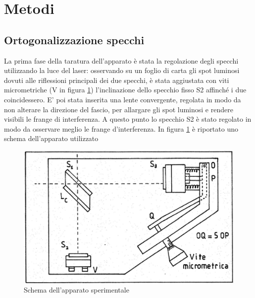 \documentclass{article}
\begin{document}
\section{Metodi}
\subsection{Ortogonalizzazione specchi}
    La prima fase della taratura dell'apparato è stata la regolazione degli specchi utilizzando la luce del laser: osservando su un foglio di carta gli spot luminosi dovuti alle riflessioni principali dei due specchi, è stata aggiustata con viti micrometriche (V in figura \ref{fig:apparato}) l'inclinazione dello specchio fisso S2 affinché i due coincidessero. E' poi stata inserita una lente convergente, regolata in modo da non alterare la direzione del fascio, per allargare gli spot luminosi e rendere visibili le frange di interferenza. A questo punto lo specchio S2 è stato regolato in modo da osservare meglio le frange d'interferenza. In figura \ref{fig:apparato} è riportato uno schema dell'apparato utilizzato
    \begin{figure}[h]
        \centering
        \includegraphics[scale=0.3]{../images/apparato_michelson.png}
        \caption{Schema dell'apparato sperimentale}
        \label{fig:apparato}
    \end{figure}
\end{document}
